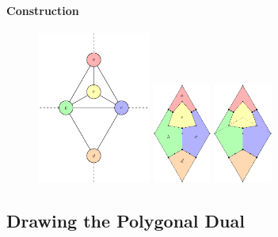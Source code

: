 \documentclass[t,18pt]{beamer}
\begin{document}
\begin{frame}[c]
  \frametitle{}
  \framesubtitle{Construction}
  \begin{figure}
    \includegraphics[align=c,height=5cm]{../Thesis/Resources/Transformation-Algorithm-2.pdf}\qquad
    \includegraphics[align=c,height=3.2753cm]{../Thesis/Resources/Transformation-Algorithm-3.pdf}\qquad
    \includegraphics[align=c,height=3.2753cm]{../Thesis/Resources/Transformation-Algorithm-4.pdf}
  \end{figure}
\end{frame}

\subsection{Drawing the Polygonal Dual}
\label{subsect:drawing-the-polygonal-dual}
\end{document}
